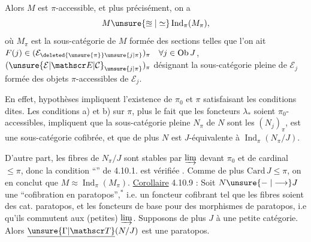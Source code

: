 Alors  $M$ est $\pi$-accessible, et plus précisément, on a
\[
 M\unsure{\approxeq|\simeq}\operatorname{Ind}_{\pi}(M_\pi),
\]
où $M_\pi$ est la sous-catégorie  de $M$ formée des sections  telles que l'on ait $F(j)\in(\mathcal E_{\deleted{\unsure{\pi}}\unsure{j|\pi}})_\pi\quad\forall j\in\operatorname{Ob}J$,
$(\unsure{\mathcal E|\mathscr E|\mathcal C}_{\unsure{j|\pi}})_\pi$ désignant la sous-catégorie pleine de $\mathcal E_j$ formée des objets $\pi$-accessibles de $\mathcal E_j$.

En effet,  hypothèses  impliquent l'existence de $\pi_0$ et $\pi$ satisfaisant les conditions dites. Les conditions a) et b) sur $\pi$, \deleted{$\unsure{\pi}$} plus le fait que les foncteurs $\lambda_*$ soient $\pi_0$-accessibles, impliquent que la sous-catégorie  pleine $N_\pi$ de $N$  sont les $(N_j)_\pi$, est une sous-catégorie cofibrée, et que de plus $N$ est $J$-équivalente à $\operatorname{Ind}_\pi(N_\pi/J)$.

 D'autre part, les fibres de $N_\pi/J$ sont stables par $\varinjlim$  devant $\pi_0$ et de cardinal $\leq\pi$, donc la condition ``'' de 4.10.1. est vérifiée .  Comme de plus $\mathrm{Card}\,J\leq\pi$, on en conclut  que  $M\approx\operatorname{Ind}_\pi(M_\pi)$.
\uline{Corollaire} 4.10.9 : Soit $N\unsure{\mathrel{-}|\longrightarrow}J$ une ``cofibration en paratopos'',$^*$ i.e. un foncteur cofibrant tel que les fibres soient des cat. paratopos, et les foncteurs
 de base  pour des morphismes de paratopos, i.e qu'ils commutent aux (petites) $\varinjlim$. Supposons de plus $J$  à une petite catégorie. Alors $\underline{\unsure{\Gamma|\mathscr T}}(N/J)$ est une  paratopos.

